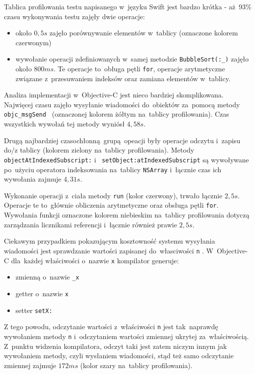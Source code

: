 \documentclass[mgr, shortabstract]{iithesis}
\newcommand{\swiftinline}[1]{
    \texttt{#1}
}
\newcommand{\objcinline}[1]{
    \texttt{#1}
}
\begin{document}
Tablica profilowania testu napisanego w~języku Swift jest bardzo krótka - aż~93\% czasu wykonywania testu zajęły dwie operacje:

\begin{itemize}
    \item około $0,5s$ zajęło porównywanie elementów w~tablicy (oznaczone kolorem czerwonym)
    \item wywołanie operacji zdefiniowanych w~samej metodzie \swiftinline{BubbleSort(:_)} zajęło około $800 ms$. Te operacje to~obługa pętli \texttt{for}, operacje arytmetyczne związane z~przesuwaniem indeksów oraz zamiana elementów w~tablicy.
\end{itemize}

Analiza implementacji w~Objective-C jest nieco bardziej skomplikowana. Najwięcej czasu zajęło wysyłanie wiadomości do~obiektów za~pomocą metody \objcinline{objc_msgSend } (oznaczonej kolorem żółtym na~tablicy profilowania). Czas wszystkich wywołań tej metody wyniósł $4,58s$.

Drugą najbardziej czasochłonną grupą opeacji były operacje odczytu i~zapisu do/z tablicy (kolorem zielony na~tablicy profilowania). Metody \objcinline{objectAtIndexedSubscript:} i~\objcinline{setObject:atIndexedSubscript} są wywoływane po~użyciu operatora indeksowania na~tablicy \objcinline{NSArray} i~łącznie czas ich wywołania zajmuje $4,31s$.

Wykonanie operacji z~ciała metody \objcinline{run} (kolor czerwony), trwało łącznie $2,5s$. Operacje te to~głównie obliczenia arytmetyczne oraz obsługa pętli \texttt{for}. Wywołania funkcji oznaczone kolorem niebieskim na~tablicy profilowania dotyczą zarządzania licznikami referencji i~łącznie również prawie $2,5s$.

Ciekawym przypadkiem pokazującym kosztowność systemu wysyłania wiadomości jest sprawdzanie wartości zapisanej do~własciwości \objcinline{n}. W~Objective-C dla~każdej właściwości o~nazwie \objcinline{x} kompilator generuje:

\begin{itemize}
    \item zmienną o~nazwie \objcinline{_x}
    \item getter o~nazwie \objcinline{x}
    \item setter \objcinline{setX:}
\end{itemize}

Z tego powodu, odczytanie wartości z~właściwości  \objcinline{n} jest tak~naprawdę wywołaniem metody \objcinline{n} i~odczytaniem wartości zmiennej ukrytej za~właściwością. Z~punktu widzenia kompilatora, odczyt taki jest zatem niczym innym jak wywołaniem metody, czyli wysłaniem wiadomości, stąd też samo odczytanie zmiennej zajmuje $172ms$ (kolor szary na~tablicy profilowania).
\end{document}
